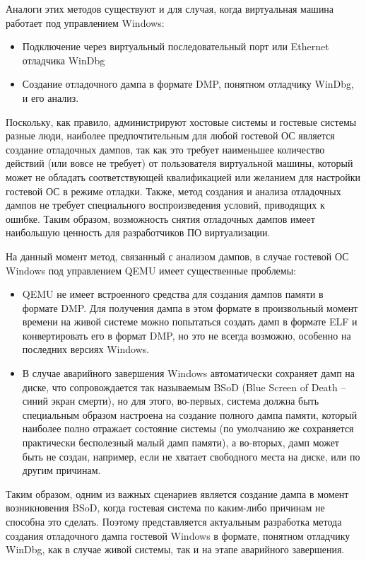 \documentclass{mipt-thesis-bs}
\begin{document}
Аналоги этих методов существуют и для случая, когда виртуальная машина работает под управлением Windows:

\begin{itemize}
\item Подключение через виртуальный последовательный порт или Ethernet отладчика WinDbg
\item Создание отладочного дампа в формате DMP, понятном отладчику WinDbg, и его анализ.
\end{itemize}

Поскольку, как правило, администрируют хостовые системы и гостевые системы разные люди, наиболее предпочтительным для любой гостевой ОС является создание отладочных дампов, так как это требует наименьшее количество действий (или вовсе не требует) от пользователя виртуальной машины, который может не обладать соответствующей квалификацией или желанием для настройки гостевой ОС в режиме отладки. Также, метод создания и анализа отладочных дампов не требует специального воспроизведения условий, приводящих к ошибке. Таким образом, возможность снятия отладочных дампов имеет наибольшую ценность для разработчиков ПО виртуализации.

На данный момент метод, связанный с анализом дампов, в случае гостевой ОС Windows под управлением QEMU имеет существенные проблемы:

\begin{itemize}
\item QEMU не имеет встроенного средства для создания дампов памяти в формате DMP. Для получения дампа в этом формате в произвольный момент времени на живой системе можно попытаться создать дамп в формате ELF и конвертировать его в формат DMP, но это не всегда возможно, особенно на последних версиях Windows.
\item В случае аварийного завершения Windows автоматически сохраняет дамп на диске, что сопровождается так называемым BSoD (Blue Screen of Death -- синий экран смерти), но для этого, во-первых, система должна быть специальным образом настроена на создание полного дампа памяти, который наиболее полно отражает состояние системы (по умолчанию же сохраняется практически бесполезный малый дамп памяти), а во-вторых, дамп может быть не создан, например, если не хватает свободного места на диске, или по другим причинам\cite{nodump}.
\end{itemize}

Таким образом, одним из важных сценариев является создание дампа в момент возникновения BSoD, когда гостевая система по каким-либо причинам не способна это сделать. Поэтому представляется актуальным разработка метода создания отладочного дампа гостевой Windows в формате, понятном отладчику WinDbg, как в случае живой системы, так и на этапе аварийного завершения.
\end{document}
